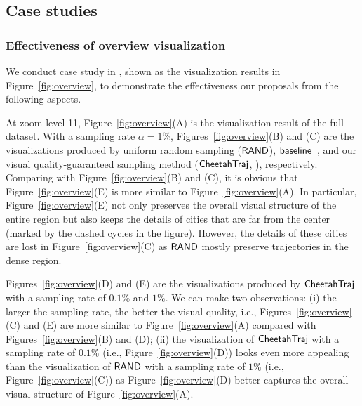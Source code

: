\subsection{Case studies}\label{sec:case}
\subsubsection{Effectiveness of overview visualization}

We conduct case study in \pt{}, shown as the visualization results in Figure~\ref{fig:overview}, to demonstrate the effectiveness our proposals from the following aspects.

At zoom level 11, Figure~\ref{fig:overview}(A) is the visualization result of the full \pt{} dataset.
With a sampling rate $\alpha \!=\! 1\%$, Figures~\ref{fig:overview}(B) and (C) are the visualizations produced by uniform random sampling ($\mathsf{RAND}$), $\mathsf{baseline}$~\cite{borcan2012improving},   
and our visual quality-guaranteed sampling method ($\mathsf{CheetahTraj}$, ), respectively. Comparing with Figure~\ref{fig:overview}(B) and (C), it is obvious that Figure~\ref{fig:overview}(E) is more similar to Figure~\ref{fig:overview}(A). In particular, Figure~\ref{fig:overview}(E) not only preserves the overall visual structure of the entire region but also keeps the details of cities that are far from the center (marked by the dashed cycles in the figure). However, the details of these cities are lost in Figure~\ref{fig:overview}(C) as $\mathsf{RAND}{}$ mostly preserve trajectories in the dense region.  

Figures~\ref{fig:overview}(D) and (E) are the visualizations produced by $\mathsf{CheetahTraj}{}$ with a sampling rate of $0.1\%$ and $1\%$. We can make two observations: (i) the larger the sampling rate, the better the visual quality, i.e., Figures~\ref{fig:overview}(C) and (E) are more similar to Figure~\ref{fig:overview}(A) compared with Figures~\ref{fig:overview}(B) and (D); (ii) the visualization of $\mathsf{CheetahTraj}$ with a sampling rate of $0.1\%$ (i.e., Figure~\ref{fig:overview}(D)) looks even more appealing than the visualization of $\mathsf{RAND}{}$ with a sampling rate of $1\%$ (i.e., Figure~\ref{fig:overview}(C)) as Figure~\ref{fig:overview}(D) better captures the overall visual structure of Figure~\ref{fig:overview}(A).

